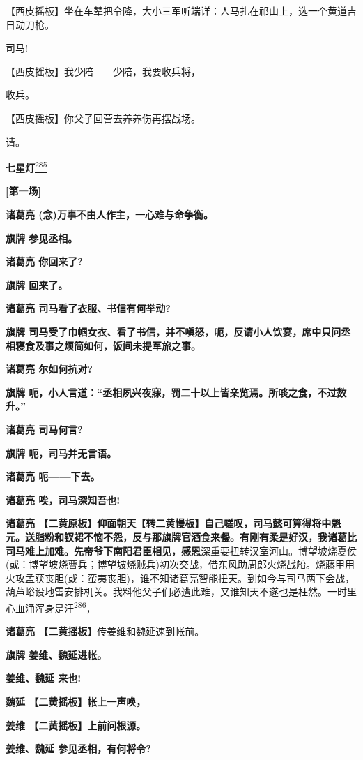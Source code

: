 【西皮摇板】坐在车辇把令降，大小三军听端详：人马扎在祁山上，选一个黄道吉日动刀枪。

司马!

【西皮摇板】我少陪------少陪，我要收兵将，

收兵。

【西皮摇板】你父子回营去养养伤再摆战场。

请。

\textbf{七星灯}\protect\hyperlink{fn285}{\textsuperscript{285}}

\textbf{{[}第一场{]}}

\textbf{诸葛亮 (念)万事不由人作主，一心难与命争衡。}

\textbf{旗牌 参见丞相。}

\textbf{诸葛亮 你回来了?}

\textbf{旗牌 回来了。}

\textbf{诸葛亮 司马看了衣服、书信有何举动?}

\textbf{旗牌
司马受了巾帼女衣、看了书信，并不嗔怒，呃，反请小人饮宴，席中只问丞相寝食及事之烦简如何，饭间未提军旅之事。}

\textbf{诸葛亮 尔如何抗对?}

\textbf{旗牌
呃，小人言道：``丞相夙兴夜寐，罚二十以上皆亲览焉。所啖之食，不过数升。''}

\textbf{诸葛亮 司马何言?}

\textbf{旗牌 呃，司马并无言语。}

\textbf{诸葛亮 呃------下去。}

\textbf{诸葛亮 唉，司马深知吾也!}

\textbf{诸葛亮
【二黄原板】仰面朝天【转二黄慢板】自己嗟叹，司马懿可算得将中魁元。送脂粉和钗裙不恼不怨，反与那旗牌官酒食来餐。有刚有柔是好汉，我诸葛比司马难上加难。先帝爷下南阳君臣相见，感恩}深重要扭转汉室河山。博望坡烧夏侯(或：博望坡烧曹兵；博望坡烧贼兵)初次交战，借东风助周郎火烧战船。烧藤甲用火攻孟获丧胆(或：蛮夷丧胆)，谁不知诸葛亮智能扭天。到如今与司马两下会战，葫芦峪设地雷安排机关。我料他父子们必遭此难，又谁知天不遂也是枉然。一时里心血涌浑身是汗\protect\hyperlink{fn286}{\textsuperscript{286}}，

\textbf{诸葛亮 【二黄摇板}】传姜维和魏延速到帐前。

\textbf{旗牌 姜维、魏延进帐。}

\textbf{姜维、魏延 来也!}

\textbf{魏延 【二黄摇板】帐上一声唤，}

\textbf{姜维 【二黄摇板】上前问根源。}

\textbf{姜维、魏延 参见丞相，有何将令?}

